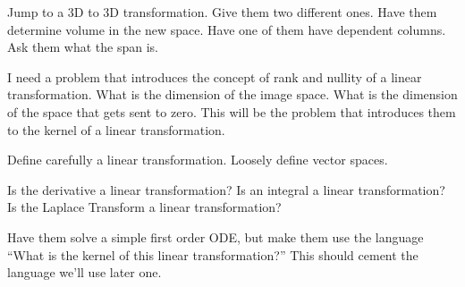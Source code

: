 \begin{problem}
Jump to a 3D to 3D transformation.  Give them two different ones.  Have them determine volume in the new space.  Have one of them have dependent columns.  Ask them what the span is.
\end{problem}
 
\begin{problem}
 I need a problem that introduces the concept of rank and nullity of a linear transformation.  What is the dimension of the image space.  What is the dimension of the space that gets sent to zero. This will be the problem that introduces them to the kernel of a linear transformation.
\end{problem}

Define carefully a linear transformation.  Loosely define vector spaces.

\begin{problem}
 Is the derivative a linear transformation? Is an integral a linear transformation?  Is the Laplace Transform a linear transformation?
\end{problem}

\begin{problem}
 Have them solve a simple first order ODE, but make them use the language ``What is the kernel of this linear transformation?'' This should cement the language we'll use later one.  
\end{problem}



























































